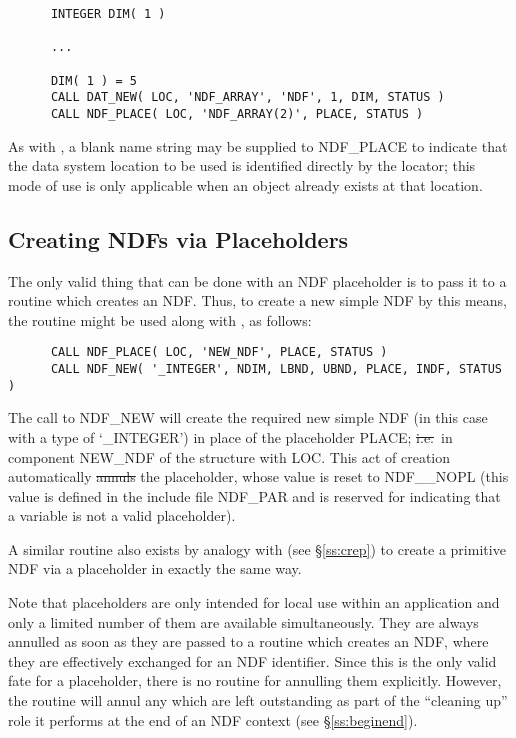 \small
\begin{verbatim}
      INTEGER DIM( 1 )

      ...

      DIM( 1 ) = 5
      CALL DAT_NEW( LOC, 'NDF_ARRAY', 'NDF', 1, DIM, STATUS )
      CALL NDF_PLACE( LOC, 'NDF_ARRAY(2)', PLACE, STATUS )
\end{verbatim}
\normalsize

As with , a blank name string may be supplied to NDF\_PLACE
to indicate that the data system location to be used is identified
directly by the locator; this mode of use is only applicable when an
object already exists at that location.

\subsection{Creating NDFs via Placeholders}

The only valid thing that can be done with an NDF placeholder is to pass it
to a routine which creates an NDF. 
Thus, to create a new simple NDF by this means, the routine  might
be used along with , as follows: 

\small
\begin{verbatim}
      CALL NDF_PLACE( LOC, 'NEW_NDF', PLACE, STATUS )
      CALL NDF_NEW( '_INTEGER', NDIM, LBND, UBND, PLACE, INDF, STATUS )
\end{verbatim}
\normalsize

The call to NDF\_NEW will create the required new simple NDF (in this case
with a type of `\_INTEGER') in place of the placeholder PLACE; \st{i.e.}\ in
component NEW\_NDF of the  structure with
 LOC.
This act of creation automatically \st{annuls\/} the placeholder, whose value
is reset to NDF\_\_NOPL (this value is defined in the include file NDF\_PAR
and is reserved for indicating that a variable is not a valid placeholder). 

A similar routine  also exists by analogy with  (see
\S\ref{ss:crep}) to create a primitive NDF via a placeholder in exactly the
same way. 

Note that placeholders are only intended for local use within an
application and only a limited number of them are available simultaneously.
They are always annulled as soon as they are passed to a routine which 
creates an NDF, where they are effectively exchanged for an NDF identifier.
Since this is the only valid fate for a placeholder, there is no routine for
annulling them explicitly.
However, the routine  will annul any which are left outstanding as
part of the ``cleaning up'' role it performs at the end of an NDF context
(see \S\ref{ss:beginend}). 

